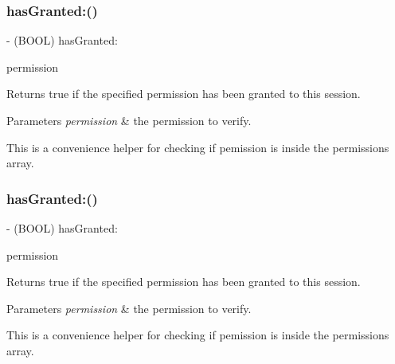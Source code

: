\subsubsection{\texorpdfstring{has\+Granted\+:()}{hasGranted:()}\hspace{0.1cm}{\footnotesize\ttfamily [2/5]}}
{\footnotesize\ttfamily -\/ (B\+O\+OL) has\+Granted\+: \begin{DoxyParamCaption}\item[{(N\+S\+String $\ast$)}]{permission }\end{DoxyParamCaption}}

Returns true if the specified permission has been granted to this session.


\begin{DoxyParams}{Parameters}
{\em permission} & the permission to verify.\\
\hline
\end{DoxyParams}
This is a convenience helper for checking if {\ttfamily pemission} is inside the permissions array. \mbox{\label{interfaceFBSession_aa74d6239fcde1f9d6dd9530538eb691b}} 
\subsubsection{\texorpdfstring{has\+Granted\+:()}{hasGranted:()}\hspace{0.1cm}{\footnotesize\ttfamily [3/5]}}
{\footnotesize\ttfamily -\/ (B\+O\+OL) has\+Granted\+: \begin{DoxyParamCaption}\item[{(N\+S\+String $\ast$)}]{permission }\end{DoxyParamCaption}}

Returns true if the specified permission has been granted to this session.


\begin{DoxyParams}{Parameters}
{\em permission} & the permission to verify.\\
\hline
\end{DoxyParams}
This is a convenience helper for checking if {\ttfamily pemission} is inside the permissions array. \mbox{\label{interfaceFBSession_aa74d6239fcde1f9d6dd9530538eb691b}} 
